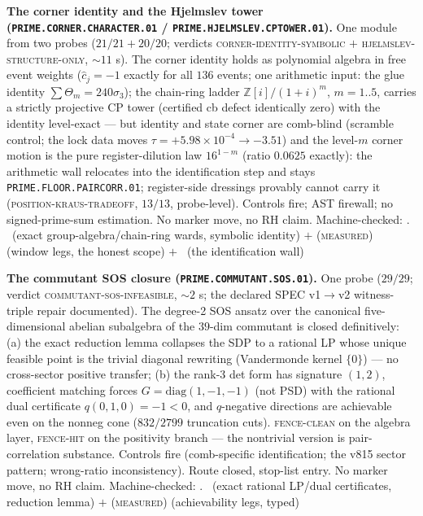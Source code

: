 \documentclass[11pt,a4paper]{article}
\newcommand{\Z}{\mathbb{Z}}
\theoremstyle{definition}
\begin{document}
\par\smallskip\noindent\textbf{The corner identity and the
Hjelmslev tower (\texttt{PRIME.CORNER.CHARACTER.01} /
\texttt{PRIME.HJELMSLEV.CPTOWER.01}).}
One module from two probes ($21/21 + 20/20$; verdicts
\textsc{corner-identity-symbolic} $+$
\textsc{hjelmslev-structure-only}, $\sim11$ s).  The corner
identity holds as polynomial algebra in free event weights
($\hat c_j = -1$ exactly for all $136$ events; one arithmetic
input: the glue identity $\sum\Theta_m = 240\sigma_3$); the
chain-ring ladder $\Z[i]/(1{+}i)^m$, $m = 1..5$, carries a
strictly projective CP tower (certified cb defect identically
zero) with the identity level-exact --- but identity and state
corner are comb-blind (scramble control; the lock data moves
$\tau = +5.98\times10^{-4} \to -3.51$) and the level-$m$ corner
motion is the pure register-dilution law $16^{1-m}$ (ratio
$0.0625$ exactly): the arithmetic wall relocates into the
identification step and stays \texttt{PRIME.FLOOR.PAIRCORR.01};
register-side dressings provably cannot carry it
(\textsc{position-kraus-tradeoff}, $13/13$, probe-level).
Controls fire; AST firewall; no signed-prime-sum estimation.  No
marker move, no RH claim.
Machine-checked: .
\mE\ (exact group-algebra/chain-ring wards, symbolic identity)
$+$ (\textsc{measured}) (window legs, the honest scope) $+$
\mO\ (the identification wall)
\par\smallskip

\par\smallskip\noindent\textbf{The commutant SOS closure
(\texttt{PRIME.COMMUTANT.SOS.01}).}
One probe ($29/29$; verdict \textsc{commutant-sos-infeasible},
$\sim2$ s; the declared SPEC v1$\to$v2 witness-triple repair
documented).  The degree-2 SOS ansatz over the canonical
five-dimensional abelian subalgebra of the $39$-dim commutant is
closed definitively: (a) the exact reduction lemma collapses the
SDP to a rational LP whose unique feasible point is the trivial
diagonal rewriting (Vandermonde kernel $\{0\}$) --- no
cross-sector positive transfer; (b) the rank-3 det form has
signature $(1,2)$, coefficient matching forces
$G = \mathrm{diag}(1,-1,-1)$ (not PSD) with the rational dual
certificate $q(0,1,0) = -1 < 0$, and $q$-negative directions are
achievable even on the nonneg cone ($832/2799$ truncation cuts).
\textsc{fence-clean} on the algebra layer, \textsc{fence-hit} on
the positivity branch --- the nontrivial version is
pair-correlation substance.  Controls fire (comb-specific
identification; the v815 sector pattern; wrong-ratio
inconsistency).  Route closed, stop-list entry.  No marker move,
no RH claim.
Machine-checked: .
\mE\ (exact rational LP/dual certificates, reduction lemma) $+$
(\textsc{measured}) (achievability legs, typed)
\par\smallskip
\end{document}
